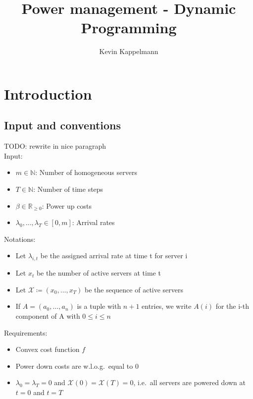 \documentclass[hidelinks]{article}
\title{Power management - Dynamic Programming}
\author{Kevin Kappelmann\\
  \multicolumn{1}{p{.7\textwidth}}{\centering\emph{Chair for Theoretical Computer Science,\\
  Technical University of Munich}}}
\theoremstyle{plain}
\theoremstyle{definition}
\theoremstyle{rem}
\newcommand{\mx}{\mathcal{X}}
\begin{document}

\begin{sloppypar}
\section{Introduction}
\subsection{Input and conventions}
TODO: rewrite in nice paragraph\\
Input:
\begin{itemize}
	\item $m\in\mathbb{N}$: Number of homogeneous servers
	\item $T\in\mathbb{N}$: Number of time steps
	\item $\beta\in\mathbb{R}_{\ge 0}$: Power up costs
	\item $\lambda_0,\ldots,\lambda_{T}\in[0,m]$: Arrival rates
\end{itemize}
Notations:
\begin{itemize}
	\item Let $\lambda_{i,t}$ be the assigned arrival rate at time t for server i
	\item Let $x_t$ be the number of active servers at time t
	\item Let $\mx\coloneqq(x_0,\ldots,x_T)$ be the sequence of active servers
	\item If $A=(a_0,\ldots,a_n)$ is a tuple with $n+1$ entries, we write $A(i)$ for the i-th component of A with $0\le i\le n$
\end{itemize}
Requirements:
\begin{itemize}
	\item Convex cost function $f$
	\item Power down costs are w.l.o.g.\ equal to 0
	\item $\lambda_0=\lambda_T=0$ and $\mx(0)=\mx(T)=0$, i.e.\ all servers are powered down at $t=0$ and $t=T$
\end{itemize}


\end{sloppypar}
\end{document}
